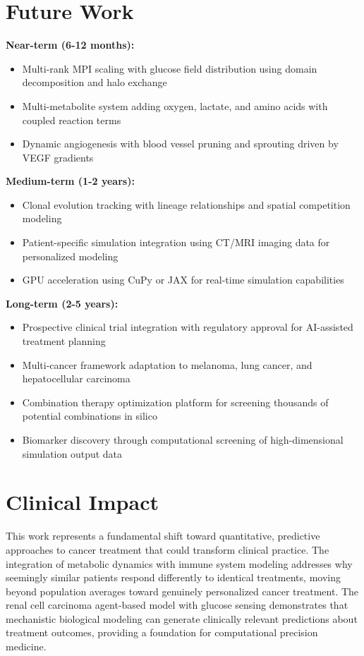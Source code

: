 \section{Future Work}
\label{sec:future-work}

\textbf{Near-term (6-12 months):}
\begin{itemize}
    \item Multi-rank MPI scaling with glucose field distribution using domain decomposition and halo exchange
    \item Multi-metabolite system adding oxygen, lactate, and amino acids with coupled reaction terms
    \item Dynamic angiogenesis with blood vessel pruning and sprouting driven by VEGF gradients
\end{itemize}

\textbf{Medium-term (1-2 years):}
\begin{itemize}
    \item Clonal evolution tracking with lineage relationships and spatial competition modeling
    \item Patient-specific simulation integration using CT/MRI imaging data for personalized modeling
    \item GPU acceleration using CuPy or JAX for real-time simulation capabilities
\end{itemize}

\textbf{Long-term (2-5 years):}
\begin{itemize}
    \item Prospective clinical trial integration with regulatory approval for AI-assisted treatment planning
    \item Multi-cancer framework adaptation to melanoma, lung cancer, and hepatocellular carcinoma
    \item Combination therapy optimization platform for screening thousands of potential combinations in silico
    \item Biomarker discovery through computational screening of high-dimensional simulation output data
\end{itemize}

\section{Clinical Impact}
\label{sec:clinical-impact}

This work represents a fundamental shift toward quantitative, predictive approaches to cancer treatment that could transform clinical practice. The integration of metabolic dynamics with immune system modeling addresses why seemingly similar patients respond differently to identical treatments, moving beyond population averages toward genuinely personalized cancer treatment. The renal cell carcinoma agent-based model with glucose sensing demonstrates that mechanistic biological modeling can generate clinically relevant predictions about treatment outcomes, providing a foundation for computational precision medicine.